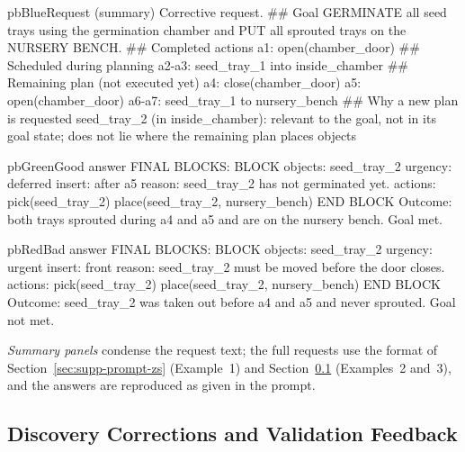 \begin{tcbraster}[raster columns=3, raster equal height=rows, raster column skip=2.5mm, raster before skip=0mm, raster after skip=1mm]
\begin{promptbox}[unbreakable]{pbBlue}{Request (summary)}
Corrective request.
## Goal
GERMINATE all seed trays using the germination chamber and PUT all sprouted trays on the NURSERY BENCH.
## Completed actions
a1: open(chamber_door)
## Scheduled during planning
a2-a3: seed_tray_1 into inside_chamber
## Remaining plan (not executed yet)
a4: close(chamber_door)   a5: open(chamber_door)
a6-a7: seed_tray_1 to nursery_bench
## Why a new plan is requested
seed_tray_2 (in inside_chamber): relevant to the goal, not in its goal state; does not lie where the remaining plan places objects
\end{promptbox}
\begin{promptbox}[unbreakable]{pbGreen}{Good answer}
FINAL BLOCKS:
BLOCK
objects: seed_tray_2
urgency: deferred
insert: after a5
reason: seed_tray_2 has not germinated yet.
actions:
pick(seed_tray_2)
place(seed_tray_2, nursery_bench)
END BLOCK
Outcome: both trays sprouted during a4 and a5 and are on the nursery bench. Goal met.
\end{promptbox}
\begin{promptbox}[unbreakable]{pbRed}{Bad answer}
FINAL BLOCKS:
BLOCK
objects: seed_tray_2
urgency: urgent
insert: front
reason: seed_tray_2 must be moved before the door closes.
actions:
pick(seed_tray_2)
place(seed_tray_2, nursery_bench)
END BLOCK
Outcome: seed_tray_2 was taken out before a4 and a5 and never sprouted. Goal not met.
\end{promptbox}
\end{tcbraster}

\noindent\emph{Summary panels} condense the request text; the full requests use the format of
Section~\ref{sec:supp-prompt-zs} (Example~1) and Section~\ref{sec:supp-correction} (Examples~2 and~3), and the
answers are reproduced as given in the prompt.

\newpage
\subsection{Discovery Corrections and Validation Feedback}
\label{sec:supp-correction}

